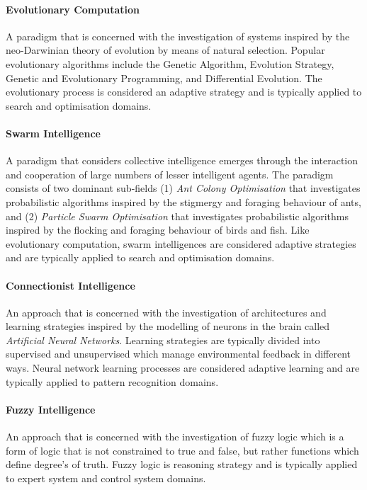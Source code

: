 \paragraph{Evolutionary Computation} A paradigm that is concerned with the investigation of systems inspired by the neo-Darwinian theory of evolution by means of natural selection. Popular evolutionary algorithms include the Genetic Algorithm, Evolution Strategy, Genetic and Evolutionary Programming, and Differential Evolution. The evolutionary process is considered an adaptive strategy and is typically applied to search and optimisation domains.
\paragraph{Swarm Intelligence} A paradigm that considers collective intelligence emerges through the interaction and cooperation of large numbers of lesser intelligent agents. The paradigm consists of two dominant sub-fields (1) \emph{Ant Colony Optimisation} that investigates probabilistic algorithms inspired by the stigmergy and foraging behaviour of ants, and (2) \emph{Particle Swarm Optimisation} that investigates probabilistic algorithms inspired by the flocking and foraging behaviour of birds and fish. Like evolutionary computation, swarm intelligences are considered adaptive strategies and are typically applied to search and optimisation domains.
\paragraph{Connectionist Intelligence} An approach that is concerned with the investigation of architectures and learning strategies inspired by the  modelling of neurons in the brain called \emph{Artificial Neural Networks}. Learning strategies are typically divided into supervised and unsupervised which manage environmental feedback in different ways. Neural network learning processes are considered adaptive learning and are typically applied to pattern recognition domains.
\paragraph{Fuzzy Intelligence} An approach that is concerned with the investigation of fuzzy logic which is a form of logic that is not constrained to true and false, but rather functions which define degree's of truth. Fuzzy logic is reasoning strategy and is typically applied to expert system and control system domains.

%
%

